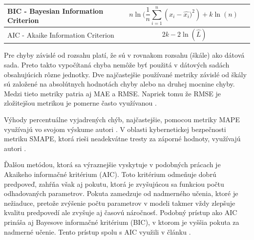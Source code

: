 \documentclass[thesismargins, thesislinespacing, openright, upjsfrontpage, combineabstracts]{rnthesis}
\begin{document}
\begin{longtable}[p]{ | p{4cm} | p{5cm} | p{5cm} | }
     \hline BIC - Bayesian Information Criterion & $${n\ln({\frac {1}{n}}\sum _{i=1}^{n}({x_{i}-{\widehat {x_{i}}})^{2}})+k\ln(n)\ }$$ & \cite{tang2016exploiting} \\
     \hline AIC - Akaike Information Criterion & $${2k-2\ln({\hat {L}})}$$ & \cite{tang2016exploiting,zhan2015predicting,wei2012intrusion} \\
     \hline

\end{longtable}


Pre chyby závislé od rozsahu platí, že sú v rovnakom rozsahu (škále) ako dátová sada. Preto takto vypočítaná chyba nemôže byť použitá v dátových sadách obsahujúcich rôzne jednotky. Dve najčastejšie používané metriky závislé od škály sú založené na absolútnych hodnotách chyby alebo na druhej mocnine chyby. Medzi tieto metriky patria aj MAE a RMSE. Napriek tomu že RMSE je zložitejšou metrikou je pomerne často využívanou \cite{tang2018disclosure,tang2017big,condon2008analysis}. 

Výhody percentuálne vyjadrených chýb, najčastejšie, pomocou metriky MAPE využívajú vo svojom výskume autori \cite{jiang2004detecting,cortez2012multi,fang2019deep,tang2018disclosure,werner2017time}. V oblasti kybernetickej bezpečnosti metriku SMAPE, ktorá rieši neadekvátne tresty za záporné hodnoty, využívajú autori \cite{roumani2015time,pokhrel2017cybersecurity}.

Ďalšou metódou, ktorá sa výraznejšie vyskytuje v podobných prácach \cite{tang2016exploiting,zhan2015predicting,wei2012intrusion} je Akaikeho informačné kritérium (AIC). Toto kritérium odmeňuje dobrú predpoveď, zahŕňa však aj pokutu, ktorá je zvyšujúcou sa funkciou počtu odhadovaných parametrov. Pokuta zamedzuje od nadmerného učenia, ktoré je nežiaduce, pretože zvýšenie počtu parametrov v modeli takmer vždy zlepšuje kvalitu predpovedí ale zvyšuje aj časovú náročnosť. Podobný prístup ako AIC prináša aj Bayesove informačné kritérium (BIC), v ktorom je vyššia pokuta za nadmerné učenie. Tento prístup spolu s AIC využili v článku \cite{tang2016exploiting}.

\end{document}
